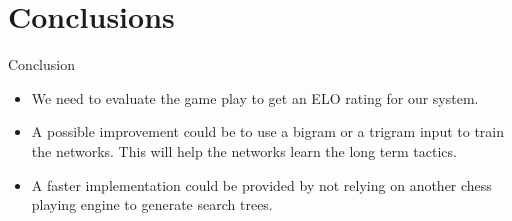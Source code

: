 \documentclass[9pt, unknownkeysallowed]{beamer}
\begin{document}
\section{Conclusions}
\begin{frame}{Conclusion}
 \begin{itemize}
  \item We need to evaluate the game play to get an ELO rating for our system.
  \item A possible improvement could be to use a bigram or a trigram input to train the networks. This will help the networks learn the long term tactics.
  \item A faster implementation could be provided by not relying on another chess playing engine to generate search trees.
 \end{itemize}

\end{frame}



{\aauwavesbg
\begin{frame}
\end{frame}}
\end{document}
